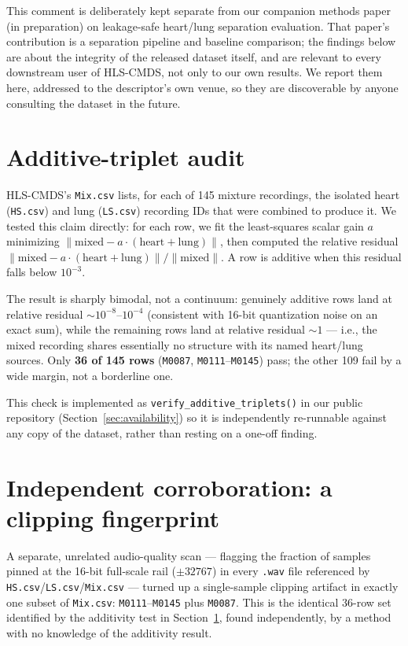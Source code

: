 \documentclass[11pt]{article}
\begin{document}
This comment is deliberately kept separate from our companion methods paper (in preparation)
on leakage-safe heart/lung separation evaluation. That paper's contribution
is a separation pipeline and baseline comparison; the findings below are
about the integrity of the released dataset itself, and are relevant to
every downstream user of HLS-CMDS, not only to our own results. We report
them here, addressed to the descriptor's own venue, so they are discoverable
by anyone consulting the dataset in the future.

\section{Additive-triplet audit}
\label{sec:additivity}

HLS-CMDS's \texttt{Mix.csv} lists, for each of 145 mixture recordings, the
isolated heart (\texttt{HS.csv}) and lung (\texttt{LS.csv}) recording IDs
that were combined to produce it. We tested this claim directly: for each
row, we fit the least-squares scalar gain $a$ minimizing
$\lVert \text{mixed} - a\cdot(\text{heart}+\text{lung}) \rVert$, then
computed the relative residual
$\lVert \text{mixed} - a\cdot(\text{heart}+\text{lung}) \rVert / \lVert \text{mixed} \rVert$.
A row is additive when this residual falls below $10^{-3}$.

The result is sharply bimodal, not a continuum: genuinely additive rows land
at relative residual $\sim 10^{-8}$--$10^{-4}$ (consistent with 16-bit
quantization noise on an exact sum), while the remaining rows land at
relative residual $\sim 1$ --- i.e., the mixed recording shares essentially
no structure with its named heart/lung sources. Only \textbf{36 of 145 rows}
(\texttt{M0087}, \texttt{M0111}--\texttt{M0145}) pass; the other 109 fail by
a wide margin, not a borderline one.

This check is implemented as \texttt{verify\_additive\_triplets()} in our
public repository (Section~\ref{sec:availability}) so it is independently
re-runnable against any copy of the dataset, rather than resting on a
one-off finding.

\section{Independent corroboration: a clipping fingerprint}
\label{sec:clipping}

A separate, unrelated audio-quality scan --- flagging the fraction of
samples pinned at the 16-bit full-scale rail ($\pm 32767$) in every
\texttt{.wav} file referenced by \texttt{HS.csv}/\texttt{LS.csv}/\texttt{Mix.csv}
--- turned up a single-sample clipping artifact in exactly one subset of
\texttt{Mix.csv}: \texttt{M0111}--\texttt{M0145} plus \texttt{M0087}. This is
the identical 36-row set identified by the additivity test in
Section~\ref{sec:additivity}, found independently, by a method with no
knowledge of the additivity result.
\end{document}
